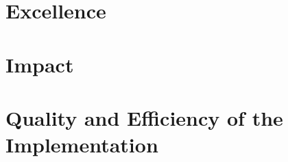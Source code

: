 \documentclass[a4paper,11pt]{article}
\begin{document}

\section{Excellence}
\vspace{-6pt}



% 



\section{Impact}
\label{sec:impact}






\section{Quality and Efficiency of the Implementation}
\label{sec:implementation}






\label{sec:textend}
\end{document}
